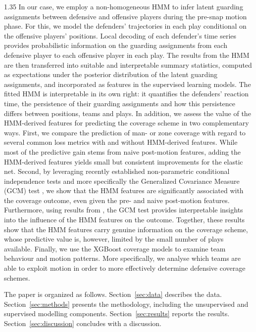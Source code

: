 \documentclass[12pt,a4paper]{article}
\begin{document}
\begin{spacing}{1.35}
In our case, we employ a non-homogeneous HMM to infer latent guarding assignments between defensive and offensive players during the pre-snap motion phase. For this, we model the defenders’ trajectories in each play conditional on the offensive players' positions. Local decoding of each defender’s time series provides probabilistic information on the guarding assignments from each defensive player to each offensive player in each play. 
The results from the HMM are then transferred into suitable and interpretable summary statistics, computed as expectations under the posterior distribution of the latent guarding assignments, and incorporated as features in the supervised learning models.
The fitted HMM is interpretable in its own right: it quantifies the defenders' reaction time, the persistence of their guarding assignments and how this persistence differs between positions, teams and plays. In addition, we assess the value of the HMM-derived features for predicting the coverage scheme in two complementary ways. First, we compare the prediction of man- or zone coverage with regard to several common loss metrics with and without HMM-derived features. While most of the predictive gain stems from naive post-motion features, adding the HMM-derived features yields small but consistent improvements for the elastic net. %
Second, by leveraging recently established non-parametric conditional independence tests and more specifically the Generalized Covariance Measure (GCM) test \citep{Shah20gcm}, we show that the HMM features are significantly associated with the coverage outcome, even given the pre- and naive post-motion features. Furthermore, using results from \citet{bajons2025rGAX}, the GCM test provides interpretable insights into the influence of the HMM features on the outcome. Together, these results show that the HMM features carry genuine information on the coverage scheme, whose predictive value is, however, limited by the small number of plays available. Finally, we use the XGBoost coverage models to examine team behaviour and motion patterns. More specifically, we analyse which teams are able to exploit motion in order to more effectively determine defensive coverage schemes. 

The paper is organized as follows. Section~\ref{sec:data} describes the data. Section~\ref{sec:methods} presents the methodology, including the unsupervised and supervised modelling components. Section~\ref{sec:results} reports the results. Section~\ref{sec:discussion} concludes with a discussion.


\end{spacing}
\end{document}
